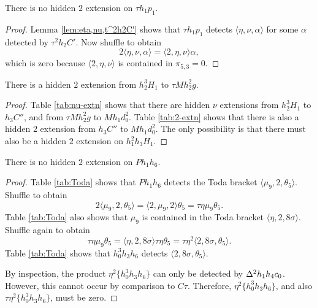 \begin{lemma}
\label{lem:2-th1p1}
There is no hidden $2$ extension on $\tau h_1 p_1$.
\end{lemma}

\begin{proof}
Lemma \ref{lem:eta,nu,t^2h2C'} shows that $\tau h_1 p_1$
detects $\langle \eta, \nu, \alpha \rangle$ for some
$\alpha$ detected by $\tau^2 h_2 C'$.
Now shuffle to obtain
\[
2 \langle \eta, \nu, \alpha \rangle = 
\langle 2, \eta, \nu \rangle \alpha,
\]
which is zero because $\langle 2, \eta, \nu \rangle$ is contained
in $\pi_{5,3} = 0$.
\end{proof}

\begin{lemma}
\label{lem:2-h1^2h3H1}
There is a hidden $2$ extension from $h_2^3 H_1$ to $\tau M h_2^2 g$.
\end{lemma}

\begin{proof}
Table \ref{tab:nu-extn} shows that there are hidden $\nu$ extensions
from $h_2^3 H_1$ to $h_3 C''$, and from
$\tau M h_2^2 g$ to $M h_1 d_0^2$.
Table \ref{tab:2-extn} shows that there is also a hidden
$2$ extension from $h_3 C''$ to $M h_1 d_0^2$.
The only possibility is that there must also be a hidden $2$
extension on $h_1^2 h_3 H_1$.
\end{proof}

\begin{lemma}
\label{lem:2-Ph1h6}
There is no hidden $2$ extension on $P h_1 h_6$.
\end{lemma}

\begin{proof}
Table \ref{tab:Toda} shows that $P h_1 h_6$ detects the Toda bracket
$\langle \mu_9, 2, \theta_5 \rangle$.
Shuffle to obtain
\[
2 \langle \mu_9, 2, \theta_5 \rangle =
\langle 2, \mu_9, 2 \rangle \theta_5 =
\tau \eta \mu_9 \theta_5.
\]
Table \ref{tab:Toda} also shows that $\mu_9$ is contained in the
Toda bracket $\langle \eta, 2, 8 \sigma \rangle$.
Shuffle again to obtain
\[
\tau \eta \mu_9 \theta_5 =
\langle \eta, 2, 8 \sigma \rangle \tau \eta \theta_5 =
\tau \eta^2 \langle 2, 8 \sigma, \theta_5 \rangle.
\]
Table \ref{tab:Toda} shows that
$h_0^3 h_3 h_6$ detects $\langle 2, 8 \sigma, \theta_5 \rangle$.

By inspection, the product $\eta^2 \{h_0^3 h_3 h_6\}$
can only be detected by $\Delta^2 h_1 h_4 c_0$.
However, this cannot occur by comparison to $C\tau$.
Therefore,
$\eta^2 \{h_0^3 h_3 h_6\}$, and also
$\tau \eta^2 \{h_0^3 h_3 h_6\}$, must be zero.
\end{proof}

